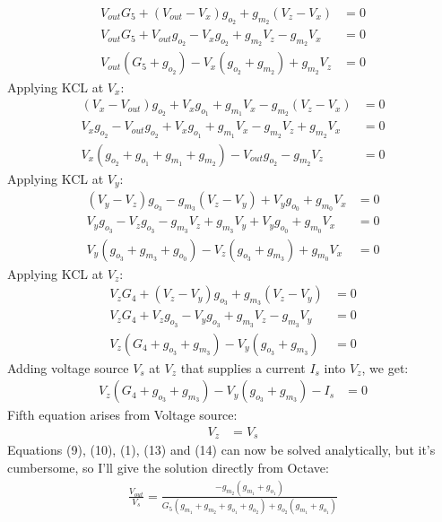 \begin{enumerate}
\begin{align*}
      V_{out}G_5 + (V_{out} - V_{x})g_{o_2} + g_{m_2}(V_{z} - V_{x}) &= 0 \\
      V_{out}G_5 + V_{out}g_{o_2} - V_{x}g_{o_2} + g_{m_2}V_{z} - g_{m_2}V_{x} &= 0 \\
      V_{out}(G_5 + g_{o_2}) - V_{x}(g_{o_2} + g_{m_2}) + g_{m_2}V_{z} &= 0 \tag{9}
    \end{align*}
    Applying KCL at $V_{x}$:
    \begin{align*}
      (V_{x} - V_{out})g_{o_2} + V_{x}g_{o_1} + g_{m_1}V_{x} - g_{m_2}(V_{z} - V_{x}) &= 0 \\
      V_{x}g_{o_2} - V_{out}g_{o_2} + V_{x}g_{o_1} + g_{m_1}V_{x} - g_{m_2}V_{z} + g_{m_2}V_{x} &= 0 \\
      V_{x}(g_{o_2} + g_{o_1} + g_{m_1} + g_{m_2}) - V_{out}g_{o_2} - g_{m_2}V_{z} &= 0 \tag{10}
    \end{align*}
    Applying KCL at $V_{y}$:
    \begin{align*}
      (V_{y} - V_{z})g_{o_3} - g_{m_3}(V_{z} - V_{y}) + V_{y}g_{o_0} + g_{m_0}V_{x} &= 0 \\
      V_{y}g_{o_3} - V_{z}g_{o_3} - g_{m_3}V_{z} + g_{m_3}V_{y} + V_{y}g_{o_0} + g_{m_0}V_{x} &= 0 \\
      V_{y}(g_{o_3} + g_{m_3} + g_{o_0}) - V_{z}(g_{o_3} + g_{m_3}) + g_{m_0}V_{x} &= 0 \tag{11}
    \end{align*}
    Applying KCL at $V_{z}$:
    \begin{align*}
      V_{z}G_4 + (V_{z} - V_{y})g_{o_3} + g_{m_3}(V_{z} - V_{y}) &= 0 \\
      V_{z}G_4 + V_{z}g_{o_3} - V_{y}g_{o_3} + g_{m_3}V_{z} - g_{m_3}V_{y} &= 0 \\
      V_{z}(G_4 + g_{o_3} + g_{m_3}) - V_{y}(g_{o_3} + g_{m_3}) &= 0 \tag{12}
    \end{align*}
    Adding voltage source $V_s$ at $V_z$ that supplies
    a current $I_s$ into $V_z$, we get:
    \begin{align*}
      V_{z}(G_4 + g_{o_3} + g_{m_3}) - V_{y}(g_{o_3} + g_{m_3}) - I_s &= 0 \tag{13}
    \end{align*}
    Fifth equation arises from Voltage source:
    \begin{align*}
      V_{z} &= V_{s} \tag{14}
    \end{align*}
    Equations (9), (10), (1), (13) and (14) can now be
    solved analytically, but it's cumbersome, so I'll give the
    solution directly from Octave:
    \begin{align*}
      \frac{V_{out}}{V_{s}} = \frac{-g_{m_2}(g_{m_1} + g_{o_1})}{G_5(g_{m_1} + g_{m_2} + g_{o_1} + g_{o_2}) + g_{o_2}(g_{m_1} + g_{o_1})} \tag{15}
    \end{align*}
\end{enumerate}

